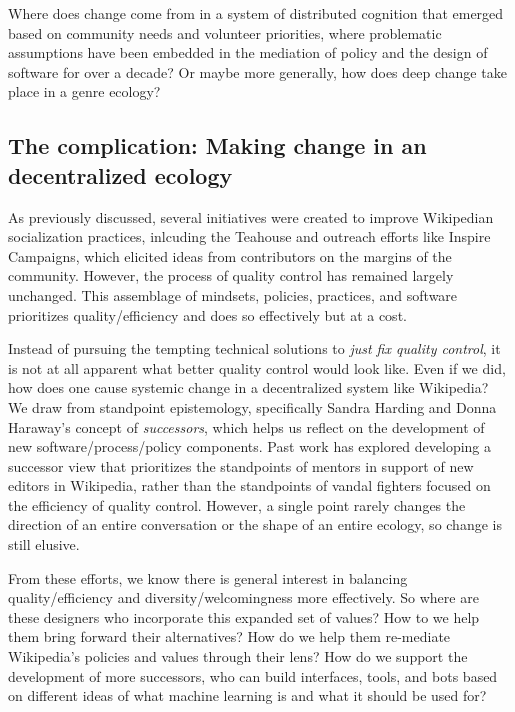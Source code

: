 Where does change come from in a system of distributed cognition that emerged based on community needs and volunteer priorities, where problematic assumptions have been embedded in the mediation of policy and the design of software for over a decade?  Or maybe more generally, how does deep change take place in a genre ecology?

\subsection{The complication: Making change in an decentralized ecology}
As previously discussed, several initiatives were created to improve Wikipedian socialization practices, inlcuding the Teahouse and outreach efforts like Inspire Campaigns\cite{morgan2015what}, which elicited ideas from contributors on the margins of the community. However, the process of quality control has remained largely unchanged.  This assemblage of mindsets, policies, practices, and software prioritizes quality/efficiency and does so effectively \cite{geiger2013levee}\cite{halfaker2014snuggle} but at a cost.

Instead of pursuing the tempting technical solutions to \emph{just fix quality control}, it is not at all apparent what better quality control would look like.  Even if we did, how does one cause systemic change in a decentralized system like Wikipedia?  We draw from standpoint epistemology, specifically Sandra Harding and Donna Haraway's concept of \emph{successors}\cite{haraway1988situated}\cite{harding1987feminism}, which helps us reflect on the development of new software/process/policy components.  Past work has explored developing a successor view that prioritizes the standpoints of mentors in support of new editors in Wikipedia, rather than the standpoints of vandal fighters focused on the efficiency of quality control\cite{halfaker2014snuggle}\cite{geiger2014successor}. However, a single point rarely changes the direction of an entire conversation or the shape of an entire ecology, so change is still elusive.

From these efforts, we know there is general interest in balancing quality/efficiency and diversity/welcomingness more effectively.  So where are these designers who incorporate this expanded set of values?  How to we help them bring forward their alternatives?  How do we help them re-mediate Wikipedia's policies and values through their lens?  How do we support the development of more successors, who can build interfaces, tools, and bots based on different ideas of what machine learning is and what it should be used for?

